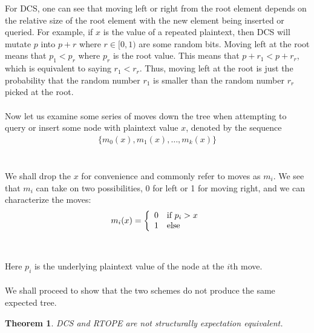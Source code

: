 \documentclass[12pt]{article}
\newtheorem{theorem}{Theorem}[section]
\begin{document}
For DCS, one can see that moving left or right from the root element depends on the relative size of the root element with the new element being inserted or queried. For example, if $x$ is the value of a repeated plaintext, then DCS will mutate $p$ into $p + r$ where $r \in [0,1)$ are some random bits. Moving left at the root means that $p_1 < p_r$ where $p_r$ is the root value. This means that $p + r_1 < p + r_r$, which is equivalent to saying $r_1 < r_r$. Thus, moving left at the root is just the probability that the random number $r_1$ is smaller than the random number $r_r$ picked at the root. \\ \\
Now let us examine some series of moves down the tree when attempting to query or insert some node with plaintext value $x$, denoted by the sequence
  \begin{eqnarray}
    \{ m_0(x), m_1(x), \ldots, m_k(x) \}
  \end{eqnarray} \\ \\
We shall drop the $x$ for convenience and commonly refer to moves as $m_i$. We see that $m_i$ can take on two possibilities, 0 for left or 1 for moving right, and we can characterize the moves:
  \begin{eqnarray}
    m_i(x) = \left\{ \begin{array}{l l}
        0 & \textrm{if } p_i > x \\
        1 & \textrm{else}
    \end{array} \right.
  \end{eqnarray}\\ \\
Here $p_i$ is the underlying plaintext value of the node at the $i$th move.\\ \\
We shall proceed to show that the two schemes do not produce the same expected tree. \begin{theorem}
    DCS and RTOPE are not structurally expectation equivalent.
  \end{theorem}\\ \\
\end{document}
